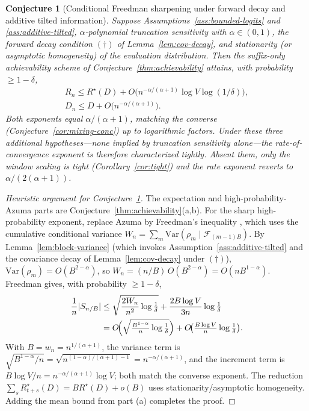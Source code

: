 \documentclass[11pt]{article}
\newcommand{\F}{\mathcal{F}}
\theoremstyle{plain}
\newtheorem{conjecture}[theorem]{Conjecture}
\theoremstyle{definition}
\theoremstyle{remark}
\begin{document}
\begin{conjecture}[Conditional Freedman sharpening under forward decay and additive tilted information]
\label{thm:achievability-tight}
Suppose Assumptions~\ref{ass:bounded-logits} and
\ref{ass:additive-tilted}, $\alpha$-polynomial truncation
sensitivity with $\alpha \in (0,1)$, the forward decay condition
$(\dagger)$ of Lemma~\ref{lem:cov-decay}, and stationarity (or
asymptotic homogeneity) of the evaluation distribution. Then the
suffix-only achievability scheme of Conjecture~\ref{thm:achievability}
attains, with probability $\geq 1-\delta$,
\[
\begin{gathered}
R_n \leq R^\star(D)
  + O\!\bigl(n^{-\alpha/(\alpha+1)}\log V \log(1/\delta)\bigr),\\
D_n \leq D + O\!\bigl(n^{-\alpha/(\alpha+1)}\bigr).
\end{gathered}
\]
Both exponents equal $\alpha/(\alpha+1)$, matching the converse
(Conjecture~\ref{cor:mixing-conc}) up to logarithmic factors. Under
these three additional hypotheses---none implied by truncation
sensitivity alone---the rate-of-convergence exponent is therefore
characterized tightly. Absent them, only the window scaling is
tight (Corollary~\ref{cor:tight}) and the rate exponent reverts to
$\alpha/(2(\alpha+1))$.
\end{conjecture}

\begin{proof}[Heuristic argument for Conjecture~\ref{thm:achievability-tight}]
The expectation and high-probability-Azuma parts are
Conjecture~\ref{thm:achievability}(a,b). For the sharp
high-probability exponent, replace Azuma by Freedman's inequality
\citep{freedman1975tail}, which uses the cumulative conditional
variance $W_n = \sum_m \mathrm{Var}(\rho_m \mid \F_{(m-1)B})$. By
Lemma~\ref{lem:block-variance} (which invokes
Assumption~\ref{ass:additive-tilted} and the covariance decay of
Lemma~\ref{lem:cov-decay} under $(\dagger)$),
$\mathrm{Var}(\rho_m) = O(B^{2-\alpha})$, so
$W_n = (n/B)\,O(B^{2-\alpha}) = O(n B^{1-\alpha})$. Freedman gives,
with probability $\geq 1-\delta$,
\[
\begin{split}
\frac1n|S_{n/B}|
&\leq \sqrt{\frac{2 W_n}{n^2}\log\tfrac1\delta}
   + \frac{2B\log V}{3n}\log\tfrac1\delta\\
&= O\!\Bigl(\sqrt{\tfrac{B^{1-\alpha}}{n}\log\tfrac1\delta}\Bigr)
   + O\!\bigl(\tfrac{B\log V}{n}\log\tfrac1\delta\bigr).
\end{split}
\]
With $B = w_n = n^{1/(\alpha+1)}$, the variance term is
$\sqrt{B^{1-\alpha}/n} = \sqrt{n^{(1-\alpha)/(\alpha+1)-1}}
= n^{-\alpha/(\alpha+1)}$, and the increment term is
$B\log V/n = n^{-\alpha/(\alpha+1)}\log V$; both match the converse
exponent. The reduction $\sum_s R^\star_{t+s}(D) = B R^\star(D) +
o(B)$ uses stationarity/asymptotic homogeneity. Adding the mean
bound from part (a) completes the proof.
\end{proof}
\end{document}
